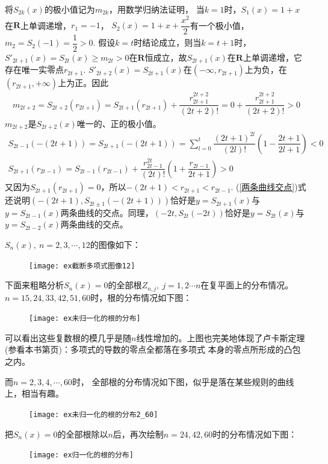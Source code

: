 \begin{enumerate}[label={【\textbf{例\thechapter.\arabic*}】},
 leftmargin=\inteval{\myenumleftmargin}pt,
 itemsep=\inteval{\myenumitempsep}pt,
 itemindent=\inteval{\myenumitemindent}pt]
将$S_{2k}(x)$的极小值记为$ m_{2k} $，用数学归纳法证明，
当$ k=1 $时，$ S_1(x)=1+x $在$ \textbf{R} $上单调递增，$ r_1=-1 $， $ S_2(x)=1+x+\dfrac{x^2}{2} $有一个极小值，$ m_2=S_2(-1)=\dfrac{1}{2}>0 $. 假设$ k=t $时结论成立，则当$ k=t+1 $时，$ S'_{2t+1}(x)=S_{2t}(x)\geq m_{2t}>0 $在$ \textbf{R} $恒成立，故$ S_{2t+1}(x) $在$ \textbf{R} $上单调递增，它存在唯一实零点$ r_{2t+1}$. $ S'_{2t+2}(x)=S_{2t+1}(x) $在$(-\infty,r_{2t+1}) $上为负，在$(r_{2t+1},+\infty) $上为正。因此
\begin{align*}
    m_{2t+2}=S_{2t+2}(r_{2t+1})=S_{2t+1}(r_{2t+1})+\dfrac{r_{2t+1}^{2t+2}}{(2t+2)!}=0+\dfrac{r_{2t+1}^{2t+2}}{(2t+2)!}>0
\end{align*}
$ m_{2t+2} $是$ S_{2t+2}(x) $唯一的、正的极小值。
\begin{gather}
    S_{2t-1}(-(2t+1))=S_{2t+1}(-(2t+1))=\sum_{l=0}^{t}\dfrac{{(2t+1)}^{2l}}{(2l)!}\left( 1-\dfrac{2t+1}{2l+1} \right) <0  \label{两条曲线交点} \\
    S_{2t+1}(r_{2t-1})=S_{2t-1}(r_{2t-1})+\dfrac{r_{2t-1}^{2t}}{(2t)!} \left( 1+\dfrac{r_{2t-1}}{2t+1}\right)>0
\end{gather}
又因为$ S_{2t+1}(r_{2t+1})=0 $，所以$ -(2t+1)<r_{2t+1}<r_{2t-1} $.
(\ref{两条曲线交点})式还说明$ (-(2t+1),S_{2t\pm 1}(-(2t+1))) $恰好是$ y=S_{2t+1}(x) $与$ y=S_{2t-1}(x) $两条曲线的交点。同理，$ (-2t,S_{2t}(-2t)) $恰好是$ y=S_{2t}(x) $与$ y=S_{2t-2}(x) $两条曲线的交点。 

$ S_n(x),\ n=2,3,\cdots, 12 $的图像如下：
\begin{figure}[h]
    \centering
    \texttt{[image: ex截断多项式图像12]}
\end{figure} 

下面来粗略分析$ S_n(x)=0 $的全部根$ Z_{n,j},\ j=1,2 \cdots n $在复平面上的分布情况。
$ n=15,24,33,42,51,60 $时，根的分布情况如下图：
\begin{figure}[h]
    \centering
    \texttt{[image: ex未归一化的根的分布]}
\end{figure} 

可以看出这些复数根的模几乎是随$ n $线性增加的。上图也完美地体现了卢卡斯定理
(参看本书第\pageref{Lucas定理-凸包}页)：多项式的导数的零点全都落在多项式
本身的零点所形成的凸包之内。

而$ n=2,3,4,\cdots,60 $时，
全部根的分布情况如下图，似乎是落在某些规则的曲线上，相当有趣。
\begin{figure}[h]
    \centering
    \texttt{[image: ex未归一化的根的分布2\_60]}
\end{figure} 

把$ S_n(x)=0 $的全部根除以$ n $后，再次绘制$ n=24,42,60 $时的分布情况如下图：
\begin{figure}[h]
    \centering
    \texttt{[image: ex归一化的根的分布]}
\end{figure} 


\end{enumerate}
